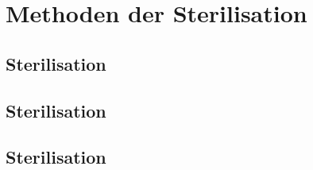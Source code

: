 \section{Methoden der Sterilisation}

\subsection{Sterilisation}

\subsection{Sterilisation}

\subsection{Sterilisation}